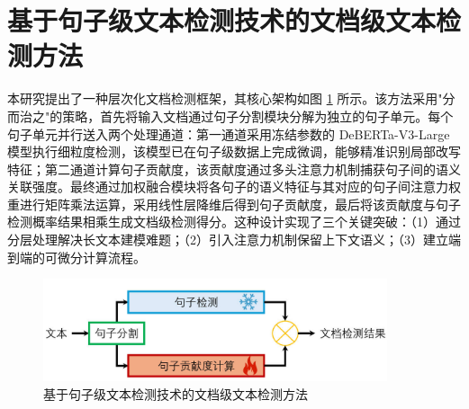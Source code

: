 


\section{基于句子级文本检测技术的文档级文本检测方法}
\label{sec:method-sent2arti}

本研究提出了一种层次化文档检测框架，其核心架构如图 \ref{fig:method-sent2arti} 所示。该方法采用"分而治之"的策略，首先将输入文档通过句子分割模块分解为独立的句子单元。每个句子单元并行送入两个处理通道：第一通道采用冻结参数的 DeBERTa-V3-Large 模型执行细粒度检测，该模型已在句子级数据上完成微调，能够精准识别局部改写特征；第二通道计算句子贡献度，该贡献度通过多头注意力机制捕获句子间的语义关联强度。最终通过加权融合模块将各句子的语义特征与其对应的句子间注意力权重进行矩阵乘法运算，采用线性层降维后得到句子贡献度，最后将该贡献度与句子检测概率结果相乘生成文档级检测得分。这种设计实现了三个关键突破：（1）通过分层处理解决长文本建模难题；（2）引入注意力机制保留上下文语义；（3）建立端到端的可微分计算流程。

\begin{figure}[htbp]
    \centering
    \includegraphics[width=0.9\textwidth]{figures/sent2arti.jpg}
    \caption{基于句子级文本检测技术的文档级文本检测方法}
    \label{fig:method-sent2arti}
\end{figure}

